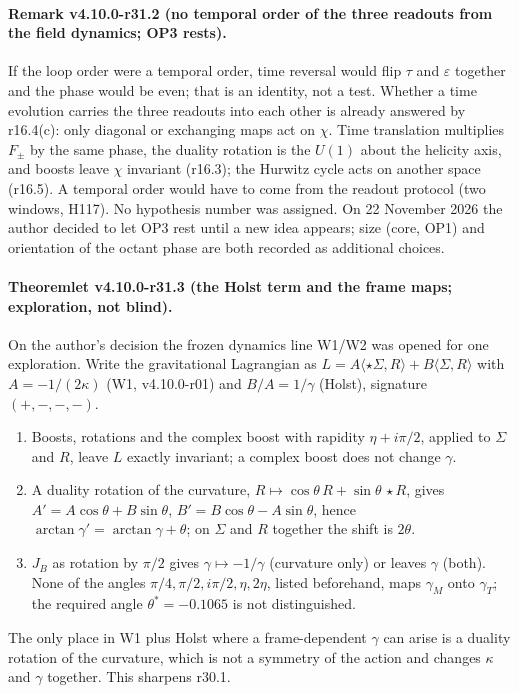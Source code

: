 \paragraph{Remark v4.10.0-r31.2 (no temporal order of the three readouts from the field dynamics; OP3 rests).}
If the loop order were a temporal order, time reversal would flip \(\tau\) and \(\varepsilon\) together and the phase would be even; that is
an identity, not a test.  Whether a time evolution carries the three readouts into each other is already answered by r16.4(c): only
diagonal or exchanging maps act on \(\chi\).  Time translation multiplies \(F_\pm\) by the same phase, the duality rotation is the \(U(1)\) about
the helicity axis, and boosts leave \(\chi\) invariant (r16.3); the Hurwitz cycle acts on another space (r16.5).  A temporal order would
have to come from the readout protocol (two windows, H117).  No hypothesis number was assigned.  On 22 November 2026 the author decided
to let OP3 rest until a new idea appears; size (core, OP1) and orientation of the octant phase are both recorded as additional choices.

\paragraph{Theoremlet v4.10.0-r31.3 (the Holst term and the frame maps; exploration, not blind).}
On the author's decision the frozen dynamics line W1/W2 was opened for one exploration.  Write the gravitational Lagrangian as
\(L=A\langle\star\Sigma,R\rangle+B\langle\Sigma,R\rangle\) with \(A=-1/(2\kappa)\) (W1, v4.10.0-r01) and \(B/A=1/\gamma\) (Holst), signature \((+,-,-,-)\).
\begin{enumerate}[leftmargin=2em]
\item[(a)] Boosts, rotations and the complex boost with rapidity \(\eta+i\pi/2\), applied to \(\Sigma\) and \(R\), leave \(L\) exactly invariant; a
complex boost does not change \(\gamma\).
\item[(b)] A duality rotation of the curvature, \(R\mapsto\cos\theta\,R+\sin\theta\,\star R\), gives \(A'=A\cos\theta+B\sin\theta\),
\(B'=B\cos\theta-A\sin\theta\), hence \(\arctan\gamma'=\arctan\gamma+\theta\); on \(\Sigma\) and \(R\) together the shift is \(2\theta\).
\item[(c)] \(J_B\) as rotation by \(\pi/2\) gives \(\gamma\mapsto-1/\gamma\) (curvature only) or leaves \(\gamma\) (both).  None of the angles
\(\pi/4,\pi/2,i\pi/2,\eta,2\eta\), listed beforehand, maps \(\gamma_M\) onto \(\gamma_T\); the required angle \(\theta^*=-0.1065\) is not distinguished.
\end{enumerate}
The only place in W1 plus Holst where a frame-dependent \(\gamma\) can arise is a duality rotation of the curvature, which is not a symmetry
of the action and changes \(\kappa\) and \(\gamma\) together.  This sharpens r30.1.

